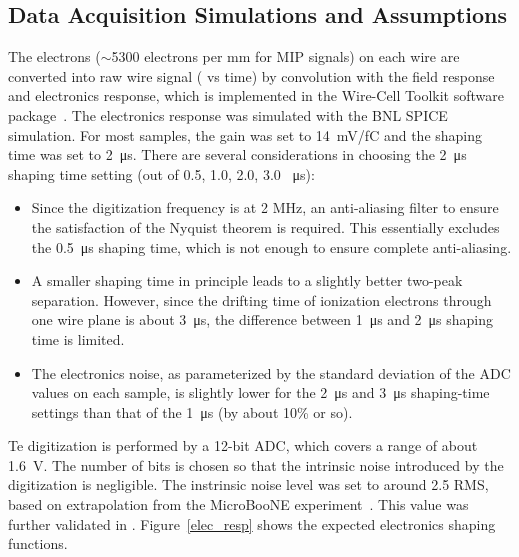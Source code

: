 \subsection{Data Acquisition Simulations and Assumptions}
\label{sec:tools-mc-daq}


  The electrons ($\sim$5300 electrons per mm for MIP signals) on each wire are converted into raw wire signal ( vs time) by convolution with the field response and electronics response, which is implemented in the Wire-Cell Toolkit software package~\cite{ref:wire_cell_toolkit}.
  The  electronics response was simulated with the BNL SPICE~\cite{spice} simulation.  For most samples, the  gain was set to \SI{14}{mV/fC} and the shaping time was set to \SI{2}{\micro\second}. There are several considerations in choosing the \SI{2}{\micro\second} shaping time setting (out of 0.5, 1.0, 2.0, 3.0 \SI{}{\micro\second}):
  \begin{itemize}
\item Since the digitization frequency is at 2 MHz, an anti-aliasing filter to ensure the satisfaction of the Nyquist theorem is required. This essentially excludes the \SI{0.5}{\micro\second} shaping time, which is not enough  to ensure complete anti-aliasing. 
\item A smaller shaping time in principle leads to a slightly better two-peak separation. However, since the drifting time of ionization electrons through one wire plane is about \SI{3}{\micro\second}, the difference between \SI{1}{\micro\second} and \SI{2}{\micro\second} shaping time is limited. 
\item The electronics noise, as parameterized by the standard deviation of the ADC values on each sample, is slightly lower for the \SI{2}{\micro\second} and \SI{3}{\micro\second} shaping-time settings than that of the \SI{1}{\micro\second} (by about 10\% or so). 
\end{itemize}
Te digitization is performed by a 12-bit ADC, which covers a range of about \SI{1.6}{V}. The number of bits is chosen so that the intrinsic noise
introduced by the digitization is negligible.  The instrinsic noise level was set to around 2.5  RMS, based on extrapolation 
  from the MicroBooNE experiment~\cite{Acciarri:2017sde}. This value was further validated in . %
  Figure~\ref{elec_resp} shows the expected electronics shaping functions.

